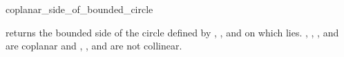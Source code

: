 \begin{ccRefFunction}{coplanar_side_of_bounded_circle}

         {returns the bounded side of the circle defined
          by , , and  on which  lies.
          \ccPrecond {}, , , and  are coplanar and
          , , and  are not collinear.}

\ccSeeAlso
{} \\
 \\

\end{ccRefFunction}

